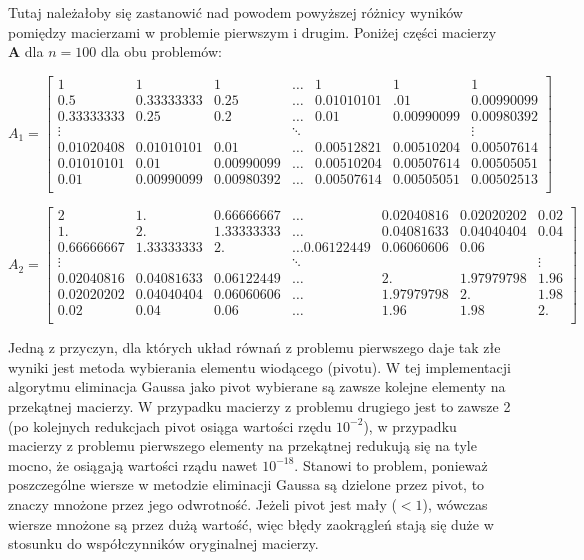 \documentclass{article}
\begin{document}
Tutaj należałoby się zastanowić nad powodem powyższej różnicy wyników pomiędzy macierzami w problemie pierwszym i drugim.
Poniżej części macierzy \textbf{A} dla $n=100$ dla obu problemów:

$$
A_1 = 
\begin{bmatrix}
1 & 1 & 1  &  \hdots & 1 & 1 & 1\\
0.5   &     0.33333333 & 0.25   &  \hdots & 0.01010101 & .01 & 0.00990099\\
0.33333333 & 0.25    &   0.2     &   \hdots & 0.01   &    0.00990099& 0.00980392\\
\vdots & & & \ddots & & & \vdots\\
0.01020408 & 0.01010101 & 0.01  &     \hdots & 0.00512821 & 0.00510204  & 0.00507614\\
0.01010101 & 0.01  &     0.00990099 & \hdots & 0.00510204 & 0.00507614 & 0.00505051\\
0.01   &    0.00990099 & 0.00980392 & \hdots & 0.00507614 & 0.00505051 & 0.00502513\\
\end{bmatrix}
$$

$$
A_2 = 
\begin{bmatrix}
2  &       1.    &     0.66666667 & \hdots & 0.02040816 & 0.02020202 & 0.02\\ 
1.    &     2.     &    1.33333333 & \hdots & 0.04081633 & 0.04040404 & 0.04\\
0.66666667 & 1.33333333 & 2.    &     \hdots 0.06122449 & 0.06060606 & 0.06\\
\vdots & & & \ddots & & & \vdots\\
0.02040816 & 0.04081633 & 0.06122449 & \hdots & 2.     &    1.97979798 & 1.96\\
0.02020202 & 0.04040404 & 0.06060606 & \hdots & 1.97979798 & 2.         & 1.98\\
0.02     &  0.04    &   0.06    &  \hdots & 1.96    &   1.98   &    2.\\
\end{bmatrix}
$$

Jedną z przyczyn, dla których układ równań z problemu pierwszego daje tak złe wyniki jest metoda wybierania elementu wiodącego
(pivotu). W tej implementacji algorytmu eliminacja Gaussa jako pivot wybierane są zawsze kolejne elementy na przekątnej 
macierzy. W przypadku macierzy z problemu drugiego jest to zawsze 2 (po kolejnych redukcjach pivot osiąga wartości rzędu $10^{-2}$), 
w przypadku macierzy z problemu pierwszego elementy na przekątnej redukują się na tyle mocno, że osiągają wartości rządu nawet $10^{-18}$. 
Stanowi to problem, ponieważ poszczególne wiersze
w metodzie eliminacji Gaussa są dzielone przez pivot, to znaczy mnożone przez jego odwrotność. Jeżeli pivot jest mały ($<1$), wówczas
wiersze mnożone są przez dużą wartość, więc błędy zaokrągleń stają się duże w stosunku do współczynników oryginalnej macierzy.
\end{document}

